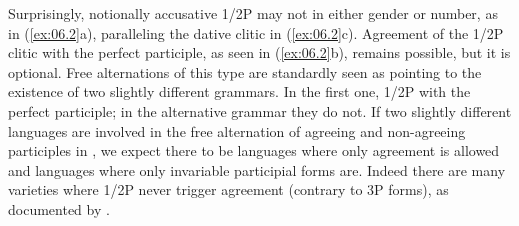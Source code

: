 \documentclass[output=paper]{langsci/langscibook}
\begin{document}
\ea\label{ex:06.1} 
    \z
\z

Surprisingly, notionally accusative 1/2P  may
not  in either gen\-der or number, as in (\ref{ex:06.2}a),
paralleling the dative clitic in (\ref{ex:06.2}c).
Agreement of the 1/2P clitic with the perfect participle, as seen in
(\ref{ex:06.2}b), remains possible, but it is optional. Free alternations
of this type are standardly seen as pointing to the existence of two slightly
different grammars. In the first one, 1/2P   with the
perfect participle; in the alternative grammar they do not. If two slightly
different languages are involved in the free alternation of agreeing and
non-agreeing participles in , we expect there to be languages
where only agreement is allowed and languages where only invariable participial
forms are. Indeed there are many  varieties where 1/2P never
trigger agreement (contrary to 3P forms), as documented by
\textcite[§5.1.2]{ManziniSavoia2005}.
\end{document}

